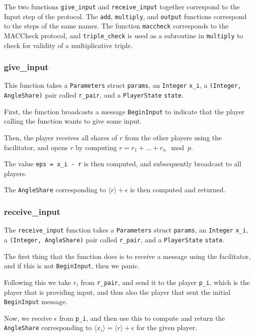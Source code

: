 \documentclass[../main.tex]{subfiles}
\begin{document}
The two functions \lstinline{give_input} and \lstinline{receive_input} together correspond to the Input step of the protocol.
The \lstinline{add}, \lstinline{multiply}, and \lstinline{output} functions correspond to the steps of the same names.
The function \lstinline{maccheck} corresponds to the MACCheck protocol, and \lstinline{triple_check} is used as a subroutine in \lstinline{multiply} to check for validity of a multiplicative triple.

\subsubsection{give\_input}
This function takes a \lstinline{Parameters} struct \lstinline{params}, an \lstinline{Integer} \lstinline{x_i}, a \lstinline{(Integer, AngleShare)} pair called \lstinline{r_pair}, and a \lstinline{PlayerState} \lstinline{state}.

First, the function broadcasts a message \lstinline{BeginInput} to indicate that the player calling the function wants to give some input.

Then, the player receives all shares of $r$ from the other players using the facilitator, and opens $r$ by computing $r = r_1 + ... + r_n \mod p$.

The value \lstinline{eps = x_i - r} is then computed, and subsequently broadcast to all players.

The \lstinline{AngleShare} corresponding to $\langle r \rangle + \epsilon$ is then computed and returned.
\subsubsection{receive\_input}
The \lstinline{receive_input} function takes a \lstinline{Parameters} struct \lstinline{params}, an \lstinline{Integer} \lstinline{x_i}, a \lstinline{(Integer, AngleShare)} pair called \lstinline{r_pair}, and a \lstinline{PlayerState} \lstinline{state}.

The first thing that the function does is to receive a message using the facilitator, and if this is not \lstinline{BeginInput}, then we panic.

Following this we take $r_i$ from \lstinline{r_pair}, and send it to the player \lstinline{p_i}, which is the player that is providing input, and thus also the player that sent the initial \lstinline{BeginInput} message.

Now, we receive $\epsilon$ from \lstinline{p_i}, and then use this to compute and return the \lstinline{AngleShare} corresponding to $\langle x_i \rangle = \langle r \rangle + \epsilon$ for the given player.
\end{document}
